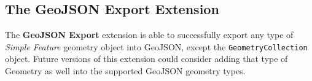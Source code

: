 \subsection{The GeoJSON Export Extension}
The \textbf{GeoJSON Export} extension is able to successfully export any type of \textit{Simple Feature} geometry object into GeoJSON, except the \texttt{GeometryCollection} object.
Future versions of this extension could consider adding that type of Geometry as well into the supported GeoJSON geometry types.
